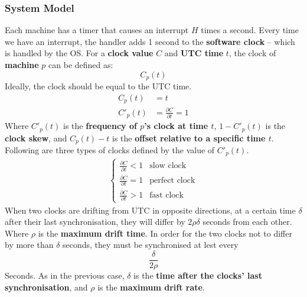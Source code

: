 \documentclass{article}
\begin{document}
\subsubsection{System Model}
Each machine has a timer that causes an interrupt $H$ times a second. Every time we have an interrupt, the handler adds 1 second to the \textbf{software clock} -- which is handled by the OS. For a \textbf{clock value} $C$ and \textbf{UTC time} $t$, the clock of \textbf{machine} $p$ can be defined as:
\[ C_p(t) \]
Ideally, the clock should be equal to the UTC time.
\begin{align*}
	C_p(t) & = t \\
	C'_p(t) & = \frac{\partial C}{\partial t} = 1
\end{align*}
Where $C'_p(t)$ is the \textbf{frequency of $p$'s clock at time $t$}, $1-C'_p(t)$ is the \textbf{clock skew}, and $C_p(t) - t$ is the \textbf{offset relative to a specific time $t$}. Following are three types of clocks defined by the value of $C'_p(t)$.
\begin{align*}
	\begin{cases}
		\displaystyle\frac{\partial C}{\partial t} < 1 & \text{slow clock} \\[10pt]
		\displaystyle\frac{\partial C}{\partial t} = 1 & \text{perfect clock} \\[10pt]
		\displaystyle\frac{\partial C}{\partial t} > 1 & \text{fast clock}
	\end{cases}
\end{align*}
When two clocks are drifting from UTC in opposite directions, at a certain time $\delta$ after their last synchronisation, they will differ by $2\rho\delta$ seconds from each other. Where $\rho$ is the \textbf{maximum drift time}. In order for the two clocks not to differ by more than $\delta$ seconds, they must be synchronised at lest every
\[ \frac{\delta}{2\rho} \]
Seconds. As in the previous case, $\delta$ is the \textbf{time after the clocks' last synchronisation}, and $\rho$ is the \textbf{maximum drift rate}.
\end{document}

